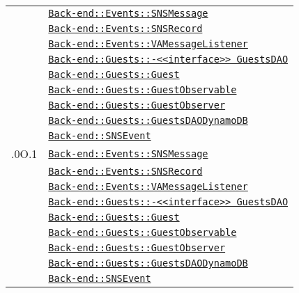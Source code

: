 \begin{longtable}{|>{\centering}m{3cm}|m{10cm}<{\centering}|}
 & \hyperref[Back-end::Events::SNSMessage]{\texttt{Back-end::Events::SNSMessage}}\\
& \hyperref[Back-end::Events::SNSRecord]{\texttt{Back-end::Events::SNSRecord}}\\
& \hyperref[Back-end::Events::VAMessageListener]{\texttt{Back-end::Events::VAMessageListener}}\\
& \hyperref[Back-end::Guests::<<interface>> GuestsDAO]{\texttt{Back-end::Guests::-\linebreak <<interface>> GuestsDAO}}\\
& \hyperref[Back-end::Guests::Guest]{\texttt{Back-end::Guests::Guest}}\\
& \hyperref[Back-end::Guests::GuestObservable]{\texttt{Back-end::Guests::GuestObservable}}\\
& \hyperref[Back-end::Guests::GuestObserver]{\texttt{Back-end::Guests::GuestObserver}}\\
& \hyperref[Back-end::Guests::GuestsDAODynamoDB]{\texttt{Back-end::Guests::GuestsDAODynamoDB}}\\
& \hyperref[Back-end::SNSEvent]{\texttt{Back-end::SNSEvent}}\\ \hline

.0O.1 & \hyperref[Back-end::Events::SNSMessage]{\texttt{Back-end::Events::SNSMessage}}\\
& \hyperref[Back-end::Events::SNSRecord]{\texttt{Back-end::Events::SNSRecord}}\\
& \hyperref[Back-end::Events::VAMessageListener]{\texttt{Back-end::Events::VAMessageListener}}\\
& \hyperref[Back-end::Guests::<<interface>> GuestsDAO]{\texttt{Back-end::Guests::-\linebreak <<interface>> GuestsDAO}}\\
& \hyperref[Back-end::Guests::Guest]{\texttt{Back-end::Guests::Guest}}\\
& \hyperref[Back-end::Guests::GuestObservable]{\texttt{Back-end::Guests::GuestObservable}}\\
& \hyperref[Back-end::Guests::GuestObserver]{\texttt{Back-end::Guests::GuestObserver}}\\
& \hyperref[Back-end::Guests::GuestsDAODynamoDB]{\texttt{Back-end::Guests::GuestsDAODynamoDB}}\\
& \hyperref[Back-end::SNSEvent]{\texttt{Back-end::SNSEvent}}\\ \hline


\end{longtable}
